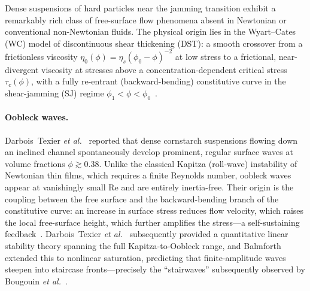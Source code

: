 \documentclass[aps,preprint,superscriptaddress,longbibliography]{revtex4-2}
\newcommand{\tauc}{\tau_c}
\newcommand{\etaz}{\eta_0}
\newcommand{\phione}{\phi_1}
\newcommand{\phizero}{\phi_0}
\begin{document}
Dense suspensions of hard particles near the jamming transition exhibit
a remarkably rich class of free-surface flow phenomena absent in Newtonian or
conventional non-Newtonian fluids.  The physical origin lies in the Wyart--Cates
(WC) model of discontinuous shear thickening (DST): a smooth crossover from a
frictionless viscosity $\etaz(\phi) = \eta_s (\phizero - \phi)^{-2}$ at low
stress to a frictional, near-divergent viscosity at stresses above a
concentration-dependent critical stress $\tauc(\phi)$, with a fully re-entrant
(backward-bending) constitutive curve in the shear-jamming (SJ) regime
$\phione < \phi < \phizero$~\cite{WyartCates2014}.

\paragraph{Oobleck waves.}
Darbois~Texier \textit{et al.}~\cite{DarboisTexier2020} reported that dense
cornstarch suspensions flowing down an inclined channel spontaneously develop
prominent, regular surface waves at volume fractions $\phi \gtrsim 0.38$.
Unlike the classical Kapitza (roll-wave) instability of Newtonian thin films,
which requires a finite Reynolds number, oobleck waves appear at vanishingly
small Re and are entirely inertia-free.  Their origin is the coupling between
the free surface and the backward-bending branch of the constitutive curve:
an increase in surface stress reduces flow velocity, which raises the local
free-surface height, which further amplifies the stress---a self-sustaining
feedback~\cite{DarboisTexier2023,Depoilly2024}.  Darbois~Texier
\textit{et al.}~\cite{DarboisTexier2023} subsequently provided a quantitative
linear stability theory spanning the full Kapitza-to-Oobleck range, and
Balmforth~\cite{Balmforth2025} extended this to nonlinear saturation, predicting
that finite-amplitude waves steepen into staircase fronts---precisely the
``stairwaves'' subsequently observed by Bougouin \textit{et al.}~\cite{Bougouin2026PRL}.
\end{document}
